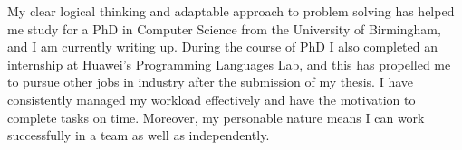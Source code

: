 
\vspace*{\fill}
\hspace{-2.5em}
\begin{minipage}{\sidewidth+0.5\margin}
\begin{center}

\vspace{2em}


\vspace{1em}

My clear logical thinking and adaptable approach to problem solving has helped
me study for a PhD in Computer Science from the University of Birmingham, and I
am currently writing up.
During the course of PhD I also completed an internship at Huawei's Programming
Languages Lab, and this has propelled me to pursue other jobs in industry after
the submission of my thesis.
I have consistently managed my workload effectively and have the motivation to
complete tasks on time.
Moreover, my personable nature means I can work successfully in a team as well
as independently.



\vspace{2em}


\vspace{1em}



\end{center}
\end{minipage}
